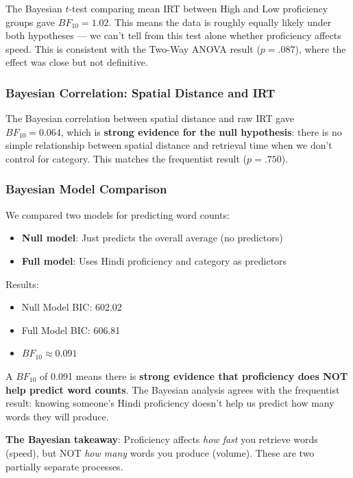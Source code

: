 \documentclass[12pt, a4paper]{article}
\begin{document}
The Bayesian $t$-test comparing mean IRT between High and Low proficiency groups gave $BF_{10} = 1.02$. This means the data is roughly equally likely under both hypotheses --- we can't tell from this test alone whether proficiency affects speed. This is consistent with the Two-Way ANOVA result ($p = .087$), where the effect was close but not definitive.

\subsubsection{Bayesian Correlation: Spatial Distance and IRT}

The Bayesian correlation between spatial distance and raw IRT gave $BF_{10} = 0.064$, which is \textbf{strong evidence for the null hypothesis}: there is no simple relationship between spatial distance and retrieval time when we don't control for category. This matches the frequentist result ($p = .750$).

\subsubsection{Bayesian Model Comparison}

We compared two models for predicting word counts:
\begin{itemize}[nosep]
    \item \textbf{Null model}: Just predicts the overall average (no predictors)
    \item \textbf{Full model}: Uses Hindi proficiency and category as predictors
\end{itemize}

Results:
\begin{itemize}[nosep]
    \item Null Model BIC: 602.02
    \item Full Model BIC: 606.81
    \item $BF_{10} \approx 0.091$
\end{itemize}

A $BF_{10}$ of 0.091 means there is \textbf{strong evidence that proficiency does NOT help predict word counts}. The Bayesian analysis agrees with the frequentist result: knowing someone's Hindi proficiency doesn't help us predict how many words they will produce.

\textbf{The Bayesian takeaway}: Proficiency affects \textit{how fast} you retrieve words (speed), but NOT \textit{how many} words you produce (volume). These are two partially separate processes.
\end{document}
